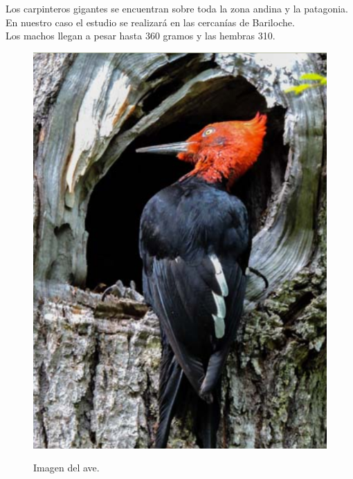 Los carpinteros gigantes se encuentran sobre toda la zona andina y la patagonia. En nuestro caso el estudio se realizará en las cercanías de Bariloche.
\\
Los machos llegan a pesar hasta 360 gramos y las hembras 310.\\
\begin{figure}[H]
	\centering
	\includegraphics[width=0.5\linewidth]{ImagenesIntroduccion/pajaro}
	\label{fig:pajaro}
	\caption{Imagen del ave.}
\end{figure}

